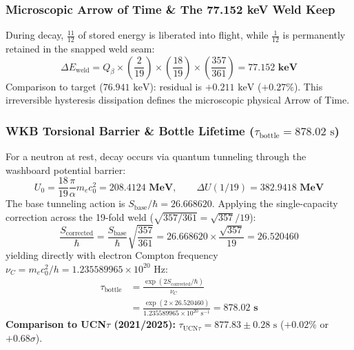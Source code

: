 \documentclass[11pt,a4paper]{article}
\begin{document}
\subsubsection{Microscopic Arrow of Time \& The 77.152 keV Weld Keep}
\label{subsubsec:arrow_of_time}

During decay, $\frac{11}{12}$ of stored energy is liberated into flight, while $\frac{1}{12}$ is permanently retained in the snapped weld seam:
\begin{equation}
\Delta E_{\text{weld}} = Q_\beta \times \left(\frac{2}{19}\right) \times \left(\frac{18}{19}\right) \times \left(\frac{357}{361}\right) = \mathbf{77.152\text{ keV}}
\end{equation}
Comparison to target ($76.941\text{ keV}$): residual is \textbf{$+0.211\text{ keV}$} ($+0.27\%$). This irreversible hysteresis dissipation defines the microscopic physical Arrow of Time.

\subsubsection{WKB Torsional Barrier \& Bottle Lifetime ($\tau_{\text{bottle}} = 878.02\text{ s}$)}
\label{subsubsec:bottle_lifetime}

For a neutron at rest, decay occurs via quantum tunneling through the washboard potential barrier:
\begin{equation}
U_0 = \frac{18}{19} \frac{\pi}{\alpha} m_e c_0^2 = \mathbf{208.4124\text{ MeV}}, \qquad \Delta U(1/19) = \mathbf{382.9418\text{ MeV}}
\end{equation}
The base tunneling action is $S_{\text{base}}/\hbar = 26.668620$. Applying the single-capacity correction across the 19-fold weld ($\sqrt{357/361} = \sqrt{357}/19$):
\begin{equation}
\frac{S_{\text{corrected}}}{\hbar} = \frac{S_{\text{base}}}{\hbar}\sqrt{\frac{357}{361}} = 26.668620 \times \frac{\sqrt{357}}{19} = \mathbf{26.520460}
\end{equation}
yielding directly with electron Compton frequency $\nu_C = m_e c_0^2 / h = 1.235589965 \times 10^{20}\text{ Hz}$:
\begin{equation}
\boxed{\begin{aligned} \tau_{\text{bottle}} &= \frac{\exp(2 S_{\text{corrected}} / \hbar)}{\nu_C} \\ &= \frac{\exp(2 \times 26.520460)}{1.235589965 \times 10^{20}\text{ s}^{-1}} = \mathbf{878.02\text{ s}} \end{aligned}}
\end{equation}
\textbf{Comparison to UCN$\tau$ (2021/2025):} $\tau_{\text{UCN}\tau} = 877.83 \pm 0.28\text{ s}$ (\textbf{$+0.02\%$} or $+0.68\sigma$).
\end{document}
